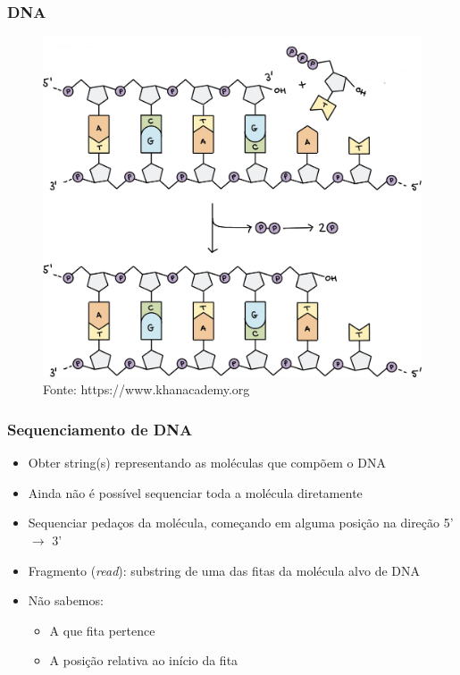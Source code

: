 \documentclass{beamer}
\begin{document}
		\begin{frame} \frametitle{DNA}
		\begin{figure}[hbtp]
			\centering
			\includegraphics[scale=0.15]{img/dna03.png}
			\caption{\tiny{Fonte: https://www.khanacademy.org}}
		\end{figure}
		\end{frame}		
	
		\begin{frame}\frametitle{Sequenciamento de DNA}
			\begin{itemize}
				\item Obter string(s) representando as moléculas que compõem o DNA
				\item Ainda não é possível sequenciar toda a molécula diretamente
				\item Sequenciar pedaços da molécula, começando em alguma posição na direção 5' $\rightarrow$ 3'
				\item Fragmento (\textit{read}): substring de uma das fitas da molécula alvo
				de DNA
				\item Não sabemos:
				\begin{itemize}
					\item A que fita pertence
					\item A posição relativa ao início da fita
				\end{itemize}
			\end{itemize}
		\end{frame}
		
\end{document}
